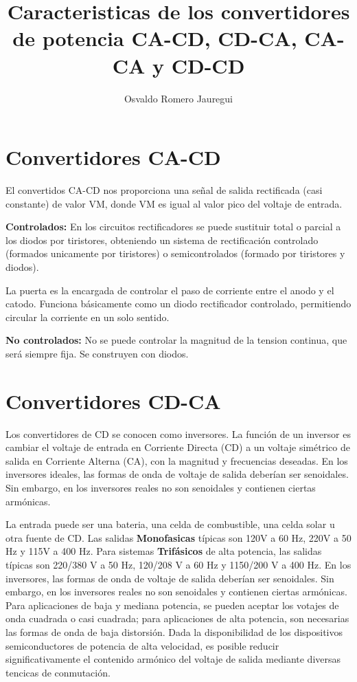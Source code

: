 \documentclass[08pt]{article}
\title{\textbf{Caracteristicas de los convertidores de potencia CA-CD, CD-CA, CA-CA y CD-CD}}
\author{Osvaldo Romero Jauregui\\}
\date{}
\begin{document}
\maketitle

\section{Convertidores CA-CD}
El convertidos CA-CD nos proporciona una señal de salida rectificada (casi constante) de valor VM, donde VM es igual al valor pico del voltaje de entrada.

\textbf{Controlados:} En los circuitos rectificadores se puede sustituir total o parcial a los diodos por tiristores, obteniendo un sistema de rectificación controlado (formados unicamente por tiristores) o semicontrolados (formado por tiristores y diodos).

La puerta es la encargada de controlar el paso de corriente entre el anodo y el catodo. Funciona básicamente como un diodo rectificador controlado, permitiendo circular la corriente en un solo sentido.

\textbf{No controlados:} No se puede controlar la magnitud de la tension continua, que será siempre fija. Se construyen con diodos.



\section{Convertidores CD-CA}
Los convertidores de CD se conocen como inversores. La función de un inversor es cambiar el voltaje de entrada en Corriente Directa (CD) a un voltaje simétrico de salida en Corriente Alterna (CA), con la magnitud y frecuencias deseadas. En los inversores  ideales, las formas de onda de voltaje de salida deberían ser senoidales. Sin embargo, en los inversores reales no son senoidales y contienen ciertas armónicas.

La entrada puede ser una bateria, una celda de combustible, una celda solar u otra fuente de CD. Las salidas \textbf{Monofasicas} típicas son 120V a 60 Hz, 220V a 50 Hz y 115V a 400 Hz. Para sistemas \textbf{Trifásicos} de alta potencia, las salidas típicas son 220/380 V a 50 Hz, 120/208 V a 60 Hz y 1150/200 V a 400 Hz.
En los inversores, las formas de onda de voltaje de salida deberían ser senoidales. Sin embargo, en los inversores reales no son senoidales y contienen ciertas armónicas. Para aplicaciones de baja y mediana potencia, se pueden aceptar los votajes de onda cuadrada o casi cuadrada; para aplicaciones de alta potencia, son necesarias las formas de onda de baja distorsión. Dada la disponibilidad de los dispositivos semiconductores de potencia de alta velocidad, es posible reducir significativamente el contenido armónico del voltaje de salida mediante diversas tencicas de conmutación.
\end{document}
